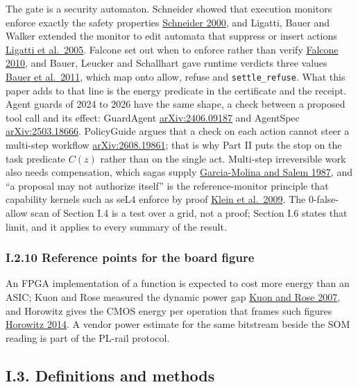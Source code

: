 \documentclass[
  10pt,
]{article}
\begin{document}
The gate is a security automaton. Schneider showed that execution
monitors enforce exactly the safety properties
\href{https://doi.org/10.1145/353323.353382}{Schneider 2000}, and
Ligatti, Bauer and Walker extended the monitor to edit automata that
suppress or insert actions
\href{https://doi.org/10.1007/s10207-004-0046-8}{Ligatti et al.~2005}.
Falcone set out when to enforce rather than verify
\href{https://doi.org/10.1007/978-3-642-16612-9_9}{Falcone 2010}, and
Bauer, Leucker and Schallhart gave runtime verdicts three values
\href{https://doi.org/10.1145/2000799.2000800}{Bauer et al.~2011}, which
map onto allow, refuse and \texttt{settle\_refuse}. What this paper adds
to that line is the energy predicate in the certificate and the receipt.
Agent guards of 2024 to 2026 have the same shape, a check between a
proposed tool call and its effect: GuardAgent
\href{https://arxiv.org/abs/2406.09187}{arXiv:2406.09187} and AgentSpec
\href{https://arxiv.org/abs/2503.18666}{arXiv:2503.18666}. PolicyGuide
argues that a check on each action cannot steer a multi-step workflow
\href{https://arxiv.org/abs/2608.19861}{arXiv:2608.19861}; that is why
Part II puts the stop on the task predicate \(C(z)\) rather than on the
single act. Multi-step irreversible work also needs compensation, which
sagas supply \href{https://doi.org/10.1145/38713.38742}{Garcia-Molina
and Salem 1987}, and ``a proposal may not authorize itself'' is the
reference-monitor principle that capability kernels such as seL4 enforce
by proof \href{https://doi.org/10.1145/1629575.1629596}{Klein et
al.~2009}. The 0-false-allow scan of Section I.4 is a test over a grid,
not a proof; Section I.6 states that limit, and it applies to every
summary of the result.

\subsubsection{I.2.10 Reference points for the board
figure}\label{i.2.10-reference-points-for-the-board-figure}

An FPGA implementation of a function is expected to cost more energy
than an ASIC; Kuon and Rose measured the dynamic power gap
\href{https://doi.org/10.1109/TCAD.2006.884574}{Kuon and Rose 2007}, and
Horowitz gives the CMOS energy per operation that frames such figures
\href{https://doi.org/10.1109/ISSCC.2014.6757323}{Horowitz 2014}. A
vendor power estimate for the same bitstream beside the SOM reading is
part of the PL-rail protocol.

\subsection{I.3. Definitions and
methods}\label{i.3.-definitions-and-methods}
\end{document}
